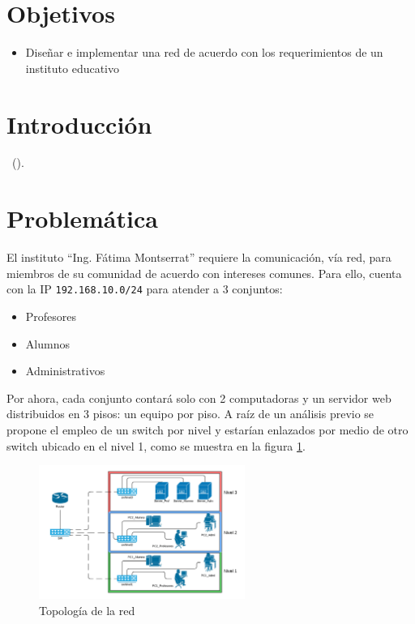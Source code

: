 \setcounter{page}{1}

\section{Objetivos}
    \begin{itemize}
        \item Diseñar e implementar una red de acuerdo con los requerimientos de un instituto educativo
    \end{itemize}

\section{Introducción}
~(\cite{buffett84}).

\section{Problemática}
El instituto ``Ing. Fátima Montserrat'' requiere la comunicación, vía red, para miembros de su comunidad de acuerdo con intereses comunes.
Para ello, cuenta con la IP \texttt{192.168.10.0/24} para atender a 3 conjuntos:
    \begin{itemize}
        \item Profesores
        \item Alumnos
        \item Administrativos
    \end{itemize}

Por ahora, cada conjunto contará solo con 2 computadoras y un servidor web distribuidos en 3 pisos: un equipo por piso. A raíz de un análisis previo se propone el empleo de un switch por nivel y estarían enlazados por medio de otro switch ubicado en el nivel 1, como se muestra en la figura \ref{fig:topologia}.

\begin{figure}[H]
    \centering
    \includegraphics[width=0.6\textwidth]{img/topologia.png}
    \caption{Topología de la red}
    \label{fig:topologia}
\end{figure}

